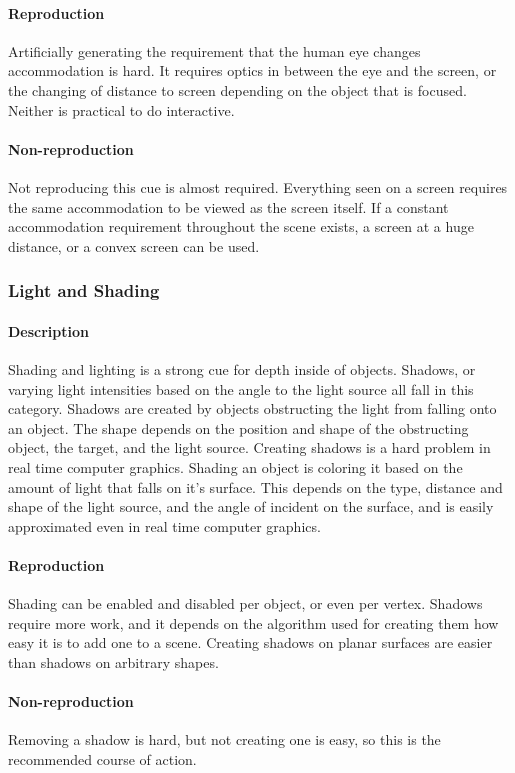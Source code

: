\paragraph{Reproduction}
Artificially generating the requirement that the human eye changes accommodation is hard. It requires optics in between the eye and the screen, or the changing of distance to screen depending on the object that is focused. Neither is practical to do interactive.

\paragraph{Non-reproduction}
Not reproducing this cue is almost required. Everything seen on a screen requires the same accommodation to be viewed as the screen itself. If a constant accommodation requirement throughout the scene exists, a screen at a huge distance, or a convex screen can be used.


\subsubsection{Light and Shading}
\paragraph{Description}
Shading and lighting is a strong cue for depth inside of objects. Shadows, or varying light intensities based on the angle to the light source all fall in this category.
Shadows are created by objects obstructing the light from falling onto an object. The shape depends on the position and shape of the obstructing object, the target, and the light source. Creating shadows is a hard problem in real time computer graphics.
Shading an object is coloring it based on the amount of light that falls on it's surface. This depends on the type, distance and shape of the light source, and the angle of incident on the surface, and is easily approximated even in real time computer graphics.

\paragraph{Reproduction}
Shading can be enabled and disabled per object, or even per vertex.
Shadows require more work, and it depends on the algorithm used for creating them how easy it is to add one to a scene.
Creating shadows on planar surfaces are easier than shadows on arbitrary shapes.

\paragraph{Non-reproduction}
Removing a shadow is hard, but not creating one is easy, so this is the recommended course of action.

